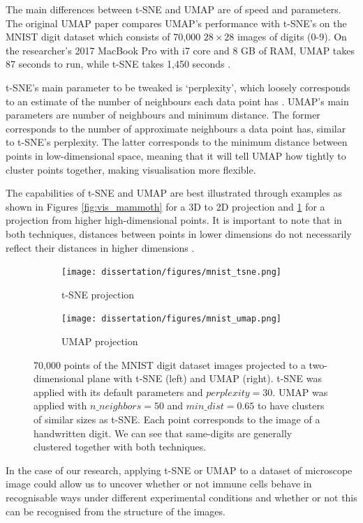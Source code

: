 The main differences between t-SNE and UMAP are of speed and parameters. The original UMAP paper compares UMAP's performance with t-SNE's on the MNIST digit dataset which consists of 70,000 $28\times28$ images of digits (0-9). On the researcher's 2017 MacBook Pro with i7 core and 8 GB of RAM, UMAP takes 87 seconds to run, while t-SNE takes 1,450 seconds \citep{umap_arxiv}.

t-SNE's main parameter to be tweaked is `perplexity', which loosely corresponds to an estimate of the number of neighbours each data point has \citep{wattenberg2016how}. UMAP's main parameters are number of neighbours and minimum distance. The former corresponds to the number of approximate neighbours a data point has, similar to t-SNE's perplexity. The latter corresponds to the minimum distance between points in low-dimensional space, meaning that it will tell UMAP how tightly to cluster points together, making visualisation more flexible.

The capabilities of t-SNE and UMAP are best illustrated through examples as shown in Figures \ref{fig:vis_mammoth} for a 3D to 2D projection and \ref{fig:vis_mnist} for a projection from higher high-dimensional points. It is important to note that in both techniques, distances between points in lower dimensions do not necessarily reflect their distances in higher dimensions \citep{Coenon2019}.

\begin{figure}[!ht]
    \centering
    \begin{subfigure}{.45\textwidth}
        \texttt{[image: dissertation/figures/mnist\_tsne.png]}
        \caption{t-SNE projection}
    \end{subfigure}
    \begin{subfigure}{.45\textwidth}
        \texttt{[image: dissertation/figures/mnist\_umap.png]}
        \caption{UMAP projection}
    \end{subfigure}
    \caption{70,000 points of the MNIST digit dataset images projected to a two-dimensional plane with t-SNE (left) and UMAP (right). t-SNE was applied with its default parameters and $perplexity=30$. UMAP was applied with $n\_neighbors=50$ and $min\_dist=0.65$ to have clusters of similar sizes as t-SNE. Each point corresponds to the image of a handwritten digit. We can see that same-digits are generally clustered together with both techniques.}
    \label{fig:vis_mnist}
\end{figure}

In the case of our research, applying t-SNE or UMAP to a dataset of microscope image could allow us to uncover whether or not immune cells behave in recognisable ways under different experimental conditions and whether or not this can be recognised from the structure of the images.

